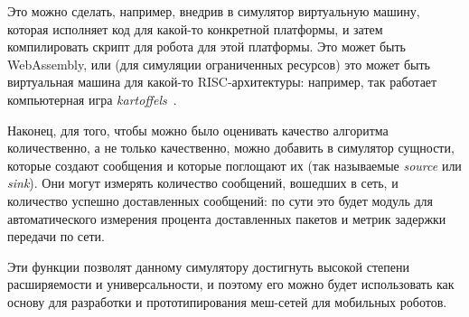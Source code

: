 \documentclass[%
]{report}
\begin{document}
Это можно сделать, например,
внедрив в симулятор виртуальную машину,
которая исполняет код для какой-то конкретной платформы,
и затем компилировать скрипт для робота для этой платформы.
Это может быть WebAssembly,
или (для симуляции ограниченных ресурсов)
это может быть виртуальная машина для какой-то RISC-архитектуры:
например, так работает компьютерная игра \emph{kartoffels}~\cite{kartoffels}.

Наконец, для того, чтобы можно было оценивать качество алгоритма
количественно, а не только качественно,
можно добавить в симулятор
сущности,
которые создают сообщения
и которые поглощают их
(так называемые \emph{source} или \emph{sink}).
Они могут измерять количество сообщений,
вошедших в сеть,
и количество успешно доставленных сообщений:
по сути это будет модуль для автоматического измерения процента доставленных пакетов
и метрик задержки передачи по сети.

Эти функции позволят данному симулятору достигнуть высокой степени 
расширяемости и универсальности,
и поэтому его можно будет использовать как основу для разработки
и прототипирования меш-сетей для мобильных роботов.






\end{document}
